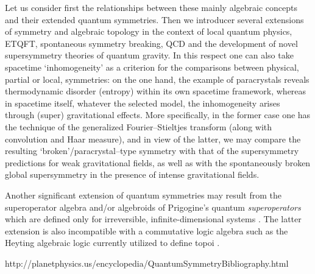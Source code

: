 \documentclass[12pt]{article}
\theoremstyle{plain}
\theoremstyle{definition}
\numberwithin{equation}{section}
\begin{document}
 Let us consider first the relationships between these mainly algebraic concepts and their extended quantum symmetries. Then we introducer several extensions of symmetry and algebraic topology in the context of local quantum physics, ETQFT, spontaneous symmetry breaking, QCD and the development of novel supersymmetry theories of quantum gravity. In this respect one can also take spacetime `inhomogeneity' as a criterion for the comparisons between physical, partial or local, symmetries: on the one hand, the example of paracrystals reveals thermodynamic disorder (entropy) within its own spacetime framework, whereas in spacetime itself, whatever the selected model, the inhomogeneity arises through (super) gravitational effects. More specifically, in the former case one has the technique of the generalized Fourier--Stieltjes transform (along with convolution and Haar measure), and in view of the latter, we may compare the resulting `broken'/paracrystal--type symmetry with that of the supersymmetry predictions for weak gravitational fields, as well as with the spontaneously broken global supersymmetry in the presence of intense gravitational fields. 

Another significant extension of quantum symmetries may result from the superoperator algebra and/or algebroids of Prigogine's quantum \textit{superoperators} which are defined only for irreversible, infinite-dimensional systems \cite{Prigogine80}. The latter extension is also incompatible with a commutative logic algebra such
as the Heyting algebraic logic currently utilized to define topoi \cite{Goldblatt84}.

http://planetphysics.us/encyclopedia/QuantumSymmetryBibliography.html
\end{document}
